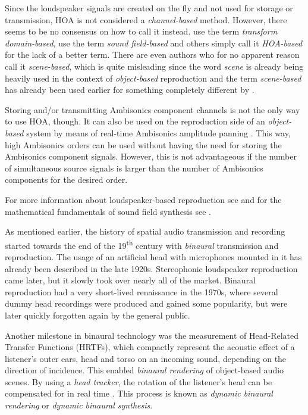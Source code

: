 Since the loudspeaker signals are created on the fly
and not used for storage or transmission,
HOA is not considered a \emph{channel-based} method.
However, there seems to be no consensus on how to call it instead.
\textcite{spors2013review} use the term
\emph{transform domain-based},
\textcite{robinson2015cinematic,nicol2018soundfield} use the term
\emph{sound field-based}
and others simply call it \emph{HOA-based}
for the lack of a better term.
There are even authors who for no apparent reason call it \emph{scene-based},
which is quite misleading since the word \emph{scene}
is already being heavily used in the context of
\emph{object-based} reproduction
and the term \emph{scene-based} has already been used earlier
for something completely different by \textcite{rumsey2002spatial}.

Storing and/or transmitting Ambisonics component channels
is not the only way to use HOA, though.
It can also be used on the reproduction side of an \emph{object-based} system
by means of real-time Ambisonics amplitude panning
\parencite{neukom2008ambisonics,zotter2019ambisonics}.
This way, high Ambisonics orders can be used
without having the need for storing the Ambisonics component signals.
However, this is not advantageous if the number of simultaneous source signals
is larger than the number of Ambisonics components for the desired order.

For more information about loudspeaker-based reproduction see
\parencite{blauert2012synopsis,spors2013review}
and for the mathematical fundamentals of sound field synthesis
see \parencite{ahrens2012analytic}.

As mentioned earlier,
the history of spatial audio transmission and recording
started towards the end of the 19\textsuperscript{th} century
with \emph{binaural} transmission and reproduction.
The usage of an artificial head
with microphones mounted in it
has already been described in the late 1920s.
Stereophonic loudspeaker
reproduction came later, but it slowly took over nearly all of the market.
Binaural reproduction had a very short-lived renaissance in the 1970s,
where several dummy head recordings were produced
and gained some popularity, but were later quickly forgotten again
by the general public.

Another milestone in binaural technology
was the measurement of Head-Related Transfer Functions (HRTFs),
which compactly represent the acoustic effect of a listener's
outer ears, head and torso on an incoming sound,
depending on the direction of incidence.
This enabled \emph{binaural rendering} of object-based audio scenes.
By using a \emph{head tracker},
the rotation of the listener's head
can be compensated for in real time
\parencite{wenzel1990convolvotron}.
This process is known as
\emph{dynamic binaural rendering} or
\emph{dynamic binaural synthesis}.

